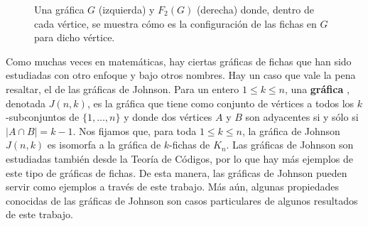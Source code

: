 \begin{figure}[ht!]
    \caption{Una gr\'afica $G$ (izquierda) y $F_2(G)$ (derecha) donde, dentro de
    cada v\'ertice, se muestra c\'omo es la configuraci\'on de las fichas en $G$
    para dicho v\'ertice.}
    \label{fig:ex-tok-graph}
\end{figure}

Como muchas veces en matem\'aticas, hay ciertas gr\'aficas de fichas que han
sido estudiadas con otro enfoque y bajo otros nombres. Hay un caso que vale la
pena resaltar, el de las gr\'aficas de Johnson. Para un entero $1 \leq k \leq
n$, una \textbf{gr\'afica} , denotada $J(n,k)$,
es la gr\'afica que tiene como conjunto de v\'ertices a todos los
$k$-subconjuntos de $\{1, \dots, n\}$ y donde dos v\'ertices $A$ y $B$ son
adyacentes si y s\'olo si $|A \cap B| = k-1$. Nos fijamos que, para toda $1 \leq
k \leq n$, la gr\'afica de Johnson $J(n,k)$ es isomorfa a la gr\'afica de
$k$-fichas de $K_n$. Las gr\'aficas de Johnson son estudiadas tambi\'en desde la
Teor\'ia de C\'odigos, por lo que hay m\'as ejemplos de este tipo de gr\'aficas
de fichas. De esta manera, las gr\'aficas de Johnson pueden servir como ejemplos
a trav\'es de este trabajo. M\'as a\'un, algunas propiedades conocidas de las
gr\'aficas de Johnson son casos particulares de algunos resultados de este
trabajo.

